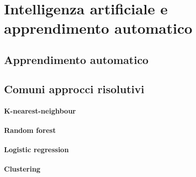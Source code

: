 \chapter{Intelligenza artificiale e apprendimento automatico}
\label{chap:letteratura}


\section{Apprendimento automatico}


\section{Comuni approcci risolutivi}

\subsubsection{K-nearest-neighbour}
\subsubsection{Random forest}
\subsubsection{Logistic regression}
\subsubsection{Clustering}